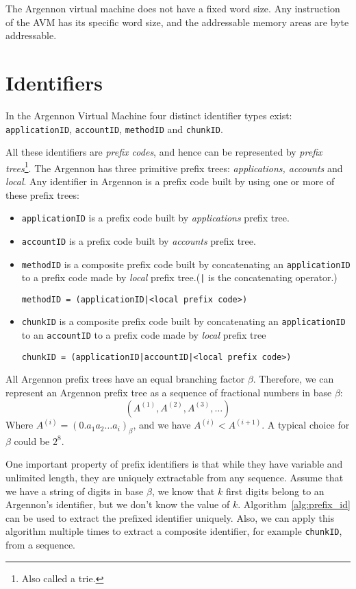 The Argennon virtual machine does not have a fixed word size. Any instruction of the AVM has
its specific word size, and the addressable memory areas are byte addressable.


\section{Identifiers}\label{sec:identifiers}

In the Argennon Virtual Machine four distinct identifier types exist: \texttt{applicationID}, \texttt{accountID},
\texttt{methodID} and \texttt{chunkID}.

All these identifiers are \emph{prefix codes}, and hence can be represented by
\emph{prefix trees}\footnote{Also called a trie.}. The Argennon has three primitive prefix trees:
\emph{applications, accounts} and \emph{local}. Any identifier in Argennon is a
prefix code built by using one or more of these prefix trees:
\begin{itemize}
    \item \texttt{applicationID} is a prefix code built by \emph{applications} prefix tree.
    \item \texttt{accountID} is a prefix code built by \emph{accounts} prefix tree.
    \item \texttt{methodID} is a composite prefix code built by concatenating an \texttt{applicationID} to
    a prefix code made by \emph{local} prefix tree.(\texttt{|} is the concatenating operator.)

    \texttt{methodID = (applicationID|<local prefix code>)}
    \item \texttt{chunkID} is a composite prefix code built by concatenating an \texttt{applicationID} to
    an \texttt{accountID} to a prefix code made by \emph{local} prefix tree

    \texttt{chunkID = (applicationID|accountID|<local prefix code>)}
\end{itemize}

All Argennon prefix trees have an equal branching factor \(\beta\). Therefore, we can represent an Argennon
prefix tree as a sequence of fractional numbers in base \(\beta\):
\[
    (A^{(1)},A^{(2)},A^{(3)},\dots)
\]
Where \(A^{(i)}=(0.a_{1}a_{2}\dots a_{i})_\beta\), and we have \(A^{(i)}<A^{(i+1)}\). A typical choice for \(\beta\)
could be \(2^8\).

One important property of prefix identifiers is that while they have variable and unlimited length, they are
uniquely extractable from any sequence. Assume that we have a string of digits in base $\beta$, we
know that $k$ first digits belong to an Argennon's identifier, but we don't know the value of $k$.
Algorithm~\ref{alg:prefix_id} can be used to extract the prefixed identifier uniquely. Also, we can apply this algorithm
multiple times to extract a composite identifier, for example \texttt{chunkID}, from a sequence.

